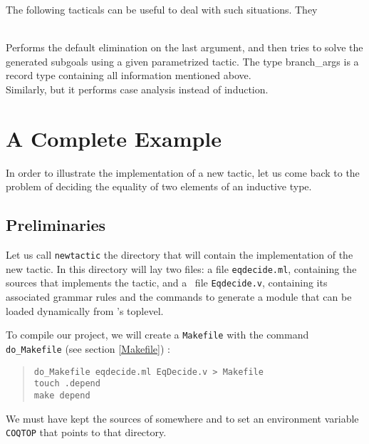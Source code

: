 The following tacticals can be useful to deal with such situations.
They  

\begin{description}
    {\\ Performs the default elimination on the last argument, and then
     tries to solve the generated subgoals using a given parametrized
     tactic. The type branch\_args is a record type containing all 
     information mentioned above.}
    {\\ Similarly, but it performs case analysis instead of induction.}
\end{description}

\section[A Complete Example]{A Complete Example\label{ACompleteExample}}

In order to illustrate the implementation of a new tactic, let us come
back to the problem of deciding the equality of two elements of an
inductive type.

\subsection{Preliminaries}

Let us call \texttt{newtactic} the directory that will contain the
implementation of the new tactic. In this directory will lay two
files: a file \texttt{eqdecide.ml}, containing the \ocaml{} sources that
implements the tactic, and a \Coq\ file \texttt{Eqdecide.v}, containing
its associated grammar rules and the commands to generate a module
that can be loaded dynamically from \Coq's toplevel. 

To compile our project, we will create a \texttt{Makefile} with the
command \texttt{do\_Makefile} (see section \ref{Makefile}) :

\begin{quotation}
  \texttt{do\_Makefile eqdecide.ml EqDecide.v > Makefile}\\
  \texttt{touch .depend}\\
  \texttt{make depend}
\end{quotation}

We must have kept the sources of \Coq{} somewhere and to set an
environment variable \texttt{COQTOP} that points to that directory.

